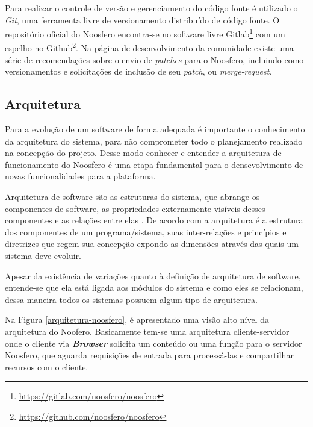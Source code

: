 Para realizar o controle de versão e gerenciamento do código fonte é utilizado o \textit{Git}, uma ferramenta livre de versionamento distribuído de código fonte. O repositório oficial do Noosfero encontra-se no software livre Gitlab\footnote{\url{https://gitlab.com/noosfero/noosfero}} com um espelho no Github\footnote{\url{https://github.com/noosfero/noosfero}}. Na página de desenvolvimento da comunidade existe uma série de recomendações sobre o envio de \textit{patches} para o Noosfero, incluindo como versionamentos e solicitações de inclusão de seu \textit{patch}, ou \textit{merge-request}.

\subsection{Arquitetura}
\label{arquitetura}
Para a evolução de um software de forma adequada é importante o conhecimento da arquitetura do sistema, para não comprometer todo o planejamento realizado na concepção do projeto. Desse modo conhecer e entender a arquitetura de funcionamento do Noosfero é uma etapa fundamental para o densevolvimento de novas funcionalidades para a plataforma.

Arquitetura de software são as estruturas do sistema, que abrange os componentes de software, as propriedades externamente visíveis desses componentes e as relações entre elas \cite{pressman2011engenharia}. De acordo com  a arquitetura é a estrutura dos componentes de um programa/sistema, suas inter-relações e princípios e diretrizes que regem sua concepção expondo as dimensões através das quais um sistema deve evoluir.

Apesar da existência de variações quanto à definição de arquitetura de software, entende-se que ela está ligada aos módulos do sistema e como eles se relacionam, dessa maneira todos os sistemas possuem algum tipo de arquitetura.

Na Figura \ref{arquitetura-noosfero}, é apresentado uma visão alto nível da arquitetura do Noofero. Basicamente tem-se uma arquitetura cliente-servidor onde o cliente via \textbf{\textit{Browser}} solicita um conteúdo ou uma função para o servidor Noosfero, que aguarda requisições de entrada para processá-las e compartilhar recursos com o cliente.

